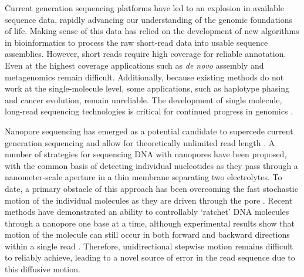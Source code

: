 \documentclass{biophys_letter}
\begin{document}
\begin{multicols}{2}


Current generation sequencing platforms have led to an explosion in available sequence data, rapidly advancing our understanding of the genomic foundations of life.
Making sense of this data has relied on the development of new algorithms in bioinformatics to process the raw short-read data into usable sequence assemblies.
However, short reads require high coverage for reliable annotation.
Even at the highest coverage applications such as {\it de novo} assembly and metagenomics remain difficult.
Additionally, because existing methods do not work at the single-molecule level, some applications, such as haplotype phasing and cancer evolution, remain unreliable.
The development of single molecule, long-read sequencing technologies is critical for continued progress in genomics \cite{Mak:2012}. 

Nanopore sequencing has emerged as a potential candidate to supercede current generation sequencing and allow for theoretically unlimited read length \cite{Branton:2008}.
A number of strategies for sequencing DNA with nanopores have been proposed, with the common basis of detecting individual nucleotides as they pass through a nanometer-scale aperture in a thin membrane separating two electrolytes.
To date, a primary obstacle of this approach has been overcoming the fast stochastic motion of the individual molecules as they are driven through the pore \cite{Venkatesan:2011, Lu:2011}.
Recent methods have demonstrated an ability to controllably `ratchet' DNA molecules through a nanopore one base at a time, although experimental results show that motion of the molecule can still occur in both forward and backward directions within a single read \cite{Luan:2011, Olasagasti:2010, Cherf:2012}.
Therefore, unidirectional stepwise motion remains difficult to reliably achieve, leading to a novel source of error in the read sequence due to this diffusive motion.


\end{multicols}
\end{document}
